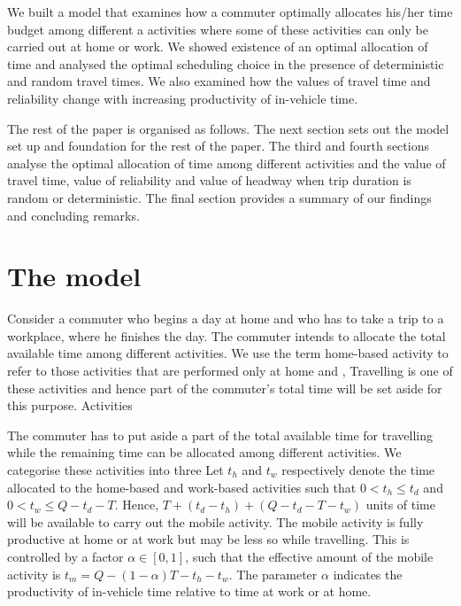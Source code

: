\documentclass[12pt,a4paper,british]{article}
\theoremstyle{definition}
\theoremstyle{plain}
\theoremstyle{plain}
\begin{document}
We built a model that examines how a commuter optimally allocates
his/her time budget among different a activities where some of these
activities can only be carried out at home or work. We showed existence
of an optimal allocation of time and analysed the optimal scheduling
choice in the presence of deterministic and random travel times. We
also examined how the values of travel time and reliability change
with increasing productivity of in-vehicle time.

The rest of the paper is organised as follows. The next section sets
out the model set up and foundation for the rest of the paper. The
third and fourth sections analyse the optimal allocation of time among
different activities and the value of travel time, value of reliability
and value of headway when trip duration is random or deterministic.
The final section provides a summary of our findings and concluding
remarks.

\section{The model}

Consider a commuter who begins a day at home and who has to take a
trip to a workplace, where he finishes the day. The commuter intends
to allocate the total available time among different activities. We
use the term home-based activity to refer to those activities that
are performed only at home and , Travelling is one of these activities
and hence part of the commuter's total time will be set aside for
this purpose. Activities

The commuter has to put aside a part of the total available time for
travelling while the remaining time can be allocated among different
activities. We categorise these activities into three Let $t_{h}$
and $t_{w}$ respectively denote the time allocated to the home-based
and work-based activities such that $0<t_{h}\leq t_{d}$ and $0<t_{w}\leq Q-t_{d}-T$.
Hence, $T+\left(t_{d}-t_{h}\right)+\left(Q-t_{d}-T-t_{w}\right)$
units of time will be available to carry out the mobile activity.
The mobile activity is fully productive at home or at work but may
be less so while travelling. This is controlled by a factor $\alpha\in\left[0,1\right]$,
such that the effective amount of the mobile activity is $t_{m}=Q-\left(1-\alpha\right)T-t_{h}-t_{w}$.
The parameter $\alpha$ indicates the productivity of in-vehicle time
relative to time at work or at home.
\end{document}
